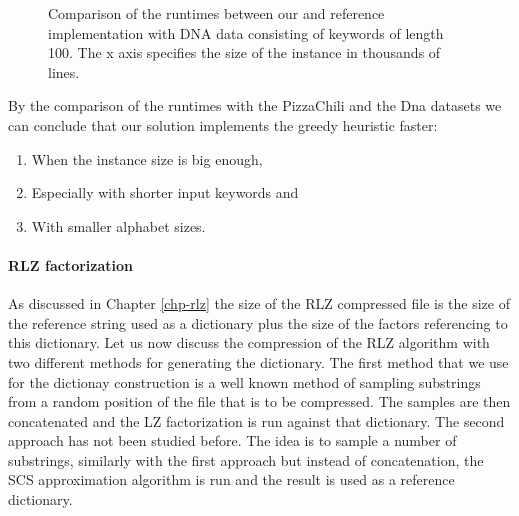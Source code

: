\documentclass[english,twoside,censored,csm,algorithms-track-2020]{HYthesisML}
\theoremstyle{plain}
\theoremstyle{definition}
\begin{document}
\begin{figure}[h!]
  \caption{Comparison of the runtimes between our and reference implementation with DNA data consisting of keywords of length 100. The x axis specifies the size of the instance in thousands of lines. }
  \label{fig-dna}
\end{figure}

  By the comparison of the runtimes with the PizzaChili and the Dna datasets we can conclude that
  our solution implements the greedy heuristic faster:

  \begin{enumerate}
  \item When the instance size is big enough,
  \item Especially with shorter input keywords and
  \item With smaller alphabet sizes.
  \end{enumerate}

\paragraph{RLZ factorization}
As discussed in Chapter \ref{chp-rlz} the size of the RLZ compressed file is the size of the reference
string used as a dictionary plus the size of the factors referencing to this dictionary. Let us now
discuss the compression of the RLZ algorithm with two different methods for generating the dictionary.
The first method that we use for the dictionay construction is a well known method of
sampling substrings from a
random position of the file that is to be compressed. The samples are then concatenated and the
LZ factorization is run against that dictionary. The second approach has not been studied before. The
idea is to sample a number of substrings, similarly with the first approach but instead of
concatenation, the SCS approximation algorithm is run and the result is used as a reference
dictionary.
\end{document}
